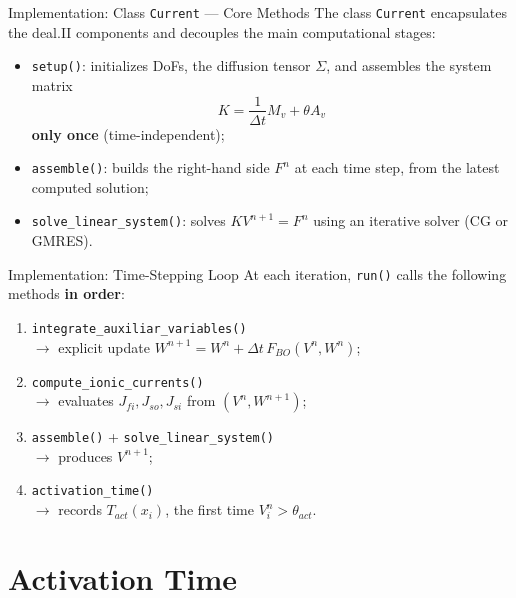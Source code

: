 \documentclass{beamer}
\begin{document}
\begin{frame}{Implementation: Class \texttt{Current} — Core Methods}
The class \texttt{Current} encapsulates the deal.II components and
decouples the main computational stages:
\begin{itemize}
  \item \texttt{setup()}: initializes DoFs, the diffusion tensor
        $\Sigma$, and assembles the system matrix
        \[
        K = \frac{1}{\Delta t}M_v + \theta A_v
        \]
        \textbf{only once} (time-independent);
  \item \texttt{assemble()}: builds the right-hand side $F^n$ at each
        time step, from the latest computed solution;
  \item \texttt{solve\_linear\_system()}: solves $KV^{n+1}=F^n$ using
        an iterative solver (CG or GMRES).
\end{itemize}
\end{frame}

\begin{frame}{Implementation: Time-Stepping Loop}
At each iteration, \texttt{run()} calls the following methods
\textbf{in order}:
\begin{enumerate}
  \item \texttt{integrate\_auxiliar\_variables()} \\
        $\rightarrow$ explicit update $W^{n+1}=W^n+\Delta t\,F_{BO}(V^n,W^n)$;
  \item \texttt{compute\_ionic\_currents()} \\
        $\rightarrow$ evaluates $J_{fi},J_{so},J_{si}$ from $(V^n,W^{n+1})$;
  \item \texttt{assemble()} + \texttt{solve\_linear\_system()} \\
        $\rightarrow$ produces $V^{n+1}$;
  \item \texttt{activation\_time()} \\
        $\rightarrow$ records $T_{act}(x_i)$, the first time
        $V_i^n > \theta_{act}$.
\end{enumerate}
\end{frame}





\section{Activation Time}
\end{document}

